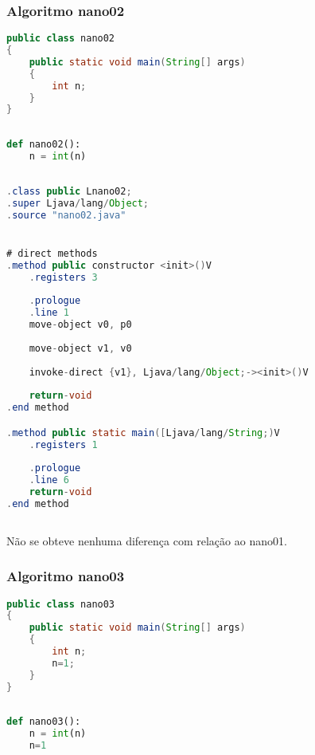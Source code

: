 \documentclass[hidelinks,12pt]{article}
\begin{document}
	\subsubsection{Algoritmo nano02}
	
	\begin{lstlisting}[caption=Código em Java,language=java]
public class nano02
{
	public static void main(String[] args)
	{
		int n;
	}
}	
	
	\end{lstlisting}
	
	\begin{lstlisting}[caption=Código em python,language=Python]
def nano02():
	n = int(n)	
	
	\end{lstlisting}
	
	\begin{lstlisting}[caption=Smali resultante do .java,language=java]
.class public Lnano02;
.super Ljava/lang/Object;
.source "nano02.java"


# direct methods
.method public constructor <init>()V
	.registers 3
	
	.prologue
	.line 1
	move-object v0, p0
	
	move-object v1, v0
	
	invoke-direct {v1}, Ljava/lang/Object;-><init>()V
	
	return-void
.end method

.method public static main([Ljava/lang/String;)V
	.registers 1
	
	.prologue
	.line 6
	return-void
.end method	
	
	\end{lstlisting}
	
	Não se obteve nenhuma diferença com relação ao nano01.
	
	\subsubsection{Algoritmo nano03}
	
	\begin{lstlisting}[caption=Código em Java,language=java]
public class nano03
{
	public static void main(String[] args)
	{
		int n;
		n=1;
	}
}	
	
	\end{lstlisting}
	
	\begin{lstlisting}[caption=Código em python,language=Python]
def nano03():
	n = int(n)
	n=1	
	
	\end{lstlisting}
	
\end{document}
